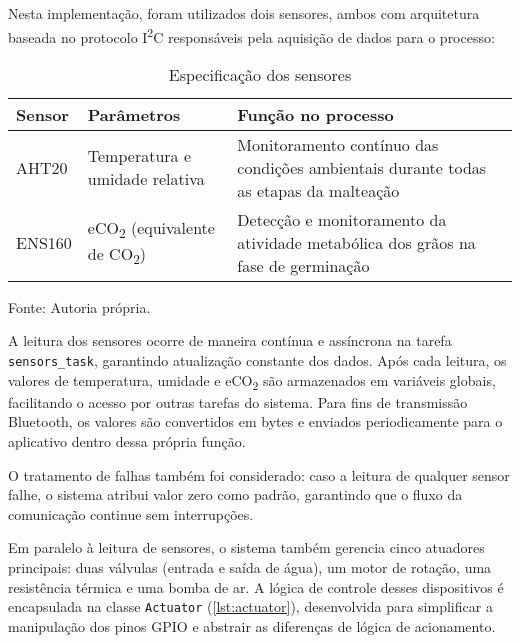Nesta implementação, foram utilizados dois sensores, ambos com arquitetura baseada no protocolo I\textsuperscript{2}C responsáveis pela aquisição de dados para o processo:

\begin{table}[ht]
    \caption{Especificação dos sensores}
    \label{tab:sensores_atuadores}
    \centering
    \begin{tabular}{llp{8cm}}
        \hline
        \textbf{Sensor} & \textbf{Parâmetros} & \textbf{Função no processo} \\
        \hline
        AHT20 & Temperatura e umidade relativa & Monitoramento contínuo das condições ambientais durante todas as etapas da malteação \\
        ENS160 & eCO\textsubscript{2} (equivalente de CO\textsubscript{2}) & Detecção e monitoramento da atividade metabólica dos grãos na fase de germinação \\
        \hline
    \end{tabular}
    
    {\centering\footnotesize Fonte: Autoria própria.\par}
\end{table}

A leitura dos sensores ocorre de maneira contínua e assíncrona na tarefa \texttt{sensors\_task}, garantindo atualização constante dos dados. Após cada leitura, os valores de temperatura, umidade e eCO\textsubscript{2} são armazenados em variáveis globais, facilitando o acesso por outras tarefas do sistema. Para fins de transmissão Bluetooth, os valores são convertidos em bytes e enviados periodicamente para o aplicativo dentro dessa própria função.

O tratamento de falhas também foi considerado: caso a leitura de qualquer sensor falhe, o sistema atribui valor zero como padrão, garantindo que o fluxo da comunicação continue sem interrupções.

Em paralelo à leitura de sensores, o sistema também gerencia cinco atuadores principais: duas válvulas (entrada e saída de água), um motor de rotação, uma resistência térmica e uma bomba de ar. A lógica de controle desses dispositivos é encapsulada na classe \texttt{Actuator} (\autoref{lst:actuator}), desenvolvida para simplificar a manipulação dos pinos GPIO e abstrair as diferenças de lógica de acionamento.

 

